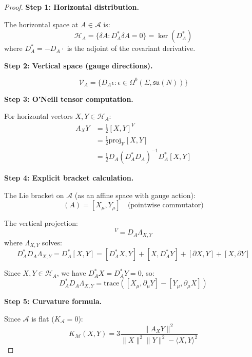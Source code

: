 \begin{proof}
\textbf{Step 1: Horizontal distribution.}

The horizontal space at $A \in \mathcal{A}$ is:
\begin{equation}
\mathcal{H}_A = \{\delta A : D_A^* \delta A = 0\} = \ker(D_A^*)
\end{equation}
where $D_A^* = -D_A \cdot$ is the adjoint of the covariant derivative.

\textbf{Step 2: Vertical space (gauge directions).}

\begin{equation}
\mathcal{V}_A = \{D_A \epsilon : \epsilon \in \Omega^0(\Sigma, \mathfrak{su}(N))\}
\end{equation}

\textbf{Step 3: O'Neill tensor computation.}

For horizontal vectors $X, Y \in \mathcal{H}_A$:
\begin{align}
A_X Y &= \frac{1}{2}[X, Y]^V \\
&= \frac{1}{2} \text{proj}_{\mathcal{V}} [X, Y] \\
&= \frac{1}{2} D_A (D_A^* D_A)^{-1} D_A^* [X, Y]
\end{align}

\textbf{Step 4: Explicit bracket calculation.}

The Lie bracket on $\mathcal{A}$ (as an affine space with gauge action):
\begin{equation}
[X, Y](A) = [X_\mu, Y_\mu] \quad \text{(pointwise commutator)}
\end{equation}

The vertical projection:
\begin{equation}
[X, Y]^V = D_A \Lambda_{X,Y}
\end{equation}
where $\Lambda_{X,Y}$ solves:
\begin{equation}
D_A^* D_A \Lambda_{X,Y} = D_A^* [X, Y] = [D_A^* X, Y] + [X, D_A^* Y] + [\partial X, Y] + [X, \partial Y]
\end{equation}

Since $X, Y \in \mathcal{H}_A$, we have $D_A^* X = D_A^* Y = 0$, so:
\begin{equation}
D_A^* D_A \Lambda_{X,Y} = \text{trace}([X_\mu, \partial_\mu Y] - [Y_\mu, \partial_\mu X])
\end{equation}

\textbf{Step 5: Curvature formula.}

Since $\mathcal{A}$ is flat ($K_{\mathcal{A}} = 0$):
\begin{equation}
K_{\mathcal{M}}(X, Y) = 3 \frac{\|A_X Y\|^2}{\|X\|^2\|Y\|^2 - \langle X, Y\rangle^2}
\end{equation}
\end{proof}

